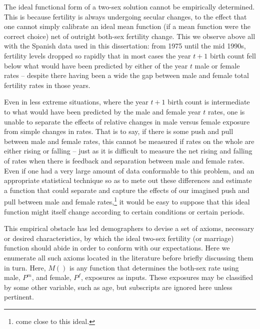  \FloatBarrier
 \label{sec:axioms}
The ideal functional form of a two-sex solution
cannot be empirically determined. This is
because fertility is always undergoing secular changes, to the effect that
one cannot simply calibrate an ideal mean function (if a mean function were the
correct choice) net of outright both-sex fertility change. This we observe above
all with the Spanish data used in this dissertation: from 1975 until the mid
1990s, fertility levels dropped so rapidly that in most cases the year $t+1$
birth count fell below what would have been predicted by either of the
year $t$ male or female rates -- despite there having been a wide the gap
between male and female total fertility rates in those years. 

Even in less
extreme situations, where the year $t+1$ birth count is intermediate to what
would have been predicted by the male and female year $t$ rates, one is unable to
separate the effects of relative changes in male versus female exposure from
simple changes in rates. That is to say, if there is some push and pull between
male and female rates, this cannot be measured if rates on the whole are either
rising or falling -- just as it is difficult to measure the net rising and
falling of rates when there is feedback and separation between male and female
rates. Even if one had a very large amount of data conformable to this problem,
and an appropriate statistical technique so as to mete out these differences 
and estimate a function that could separate and capture the effects of our
imagined push and pull between male and female
rates,\footnote{\citet{alho2000competing} come close to this ideal.} it would be
easy to suppose that this ideal function
might itself change according to certain conditions or certain periods.

This empirical obstacle has led demographers to devise a set of axioms,
necessary or desired characteristics, by which the ideal two-sex fertility
(or marriage) function should abide in order to conform with our
expectations. Here we enumerate all such axioms located in the literature 
before briefly discussing them in turn. Here, $M()$ is any function that
determines the both-sex rate using male, $P^m$, and female, $P^f$, exposures as
inputs. These exposures may be classified by some other variable, such as age, but
subscripts are ignored here unless pertinent.

